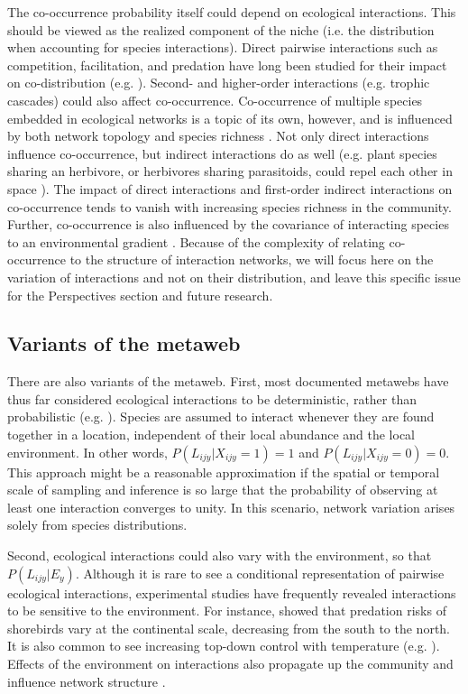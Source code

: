 \documentclass[12pt]{article}
\begin{document}
The co-occurrence probability itself could depend on ecological interactions.
This should be viewed as the realized component of the niche (i.e. the
distribution when accounting for species interactions). Direct pairwise
interactions such as competition, facilitation, and predation have long been
studied for their impact on co-distribution (e.g. \citealt{Diamond1976,
Connor1980, Gotelli2000}). Second- and higher-order interactions (e.g. trophic
cascades) could also affect co-occurrence. Co-occurrence of multiple species
embedded in ecological networks is a topic of its own, however, and is
influenced by both network topology and species richness \citep{Cazelles2016}.
Not only direct interactions influence co-occurrence, but indirect
interactions do as well (e.g. plant species sharing an herbivore, or
herbivores sharing parasitoids, could repel each other in space
\citealt{Holt1993}). The impact of direct interactions and first-order
indirect interactions on co-occurrence tends to vanish with increasing species
richness in the community. Further, co-occurrence is also influenced by the
covariance of interacting species to an environmental gradient
\citep{Cazelles2015}. Because of the complexity of relating co-occurrence to
the structure of interaction networks, we will focus here on the variation of
interactions and not on their distribution, and leave this specific issue for
the Perspectives section and future research.

\subsection*{Variants of the metaweb}

There are also variants of the metaweb. First, most documented metawebs have
thus far considered ecological interactions to be deterministic, rather than
probabilistic (e.g. \citealt{Havens1992, Wood2015}). Species are assumed to
interact whenever they are found together in a location, independent of their
local abundance and the local environment. In other words,
$P(L_{ijy}|X_{ijy}=1) = 1$ and $P(L_{ijy}|X_{ijy}=0) = 0$. This approach might
be a reasonable approximation if the spatial or temporal scale of sampling and inference is so
large that the probability of observing at least one interaction converges to
unity. In this scenario, network variation arises solely from species
distributions.

Second, ecological interactions could also vary with the environment, so that
$P(L_{ijy} |E_y)$. Although it is rare to see a conditional representation of
pairwise ecological interactions, experimental studies have frequently
revealed interactions to  be sensitive to the environment. For instance,
\citep{Mckinnon2010} showed that predation risks of shorebirds vary at the
continental scale, decreasing from the south to the north. It is also common
to see increasing top-down control with temperature (e.g. \citealt{Shurin2012,
Gray2016}). Effects of the environment on interactions also propagate up the
community and influence network structure \citep{Tylianakis2007, Woodward2010;
Petchey2010; Lelong2015}.
\end{document}
